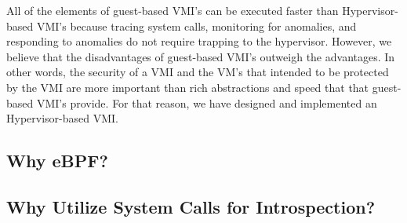 \documentclass{report}
\begin{document}
\begin{spacing}{1.5}
{\large
All of the elements of guest-based VMI's can be executed faster than Hypervisor-based VMI's because tracing system calls, monitoring for anomalies, and responding to anomalies do not require trapping to the hypervisor. However, we believe that the disadvantages of guest-based VMI's outweigh the advantages. In other words, the security of a VMI and the VM's that intended to be protected by the VMI are more important than rich abstractions and speed that that guest-based VMI's provide. For that reason, we have designed and implemented an Hypervisor-based VMI.
\newline
}














\subsection{Why eBPF?}















\subsection{Why Utilize System Calls for Introspection?}


\end{spacing}
\end{document}
